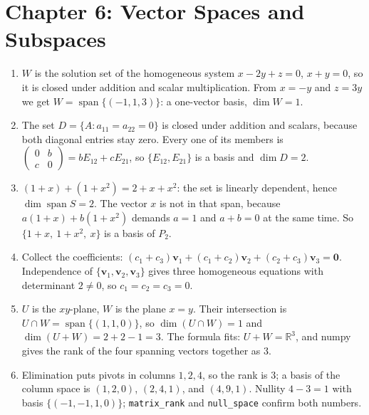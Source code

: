 
\section*{Chapter 6: Vector Spaces and Subspaces}
\begin{enumerate}[label=\textbf{6.\arabic*}]
  \item $W$ is the solution set of the homogeneous system $x-2y+z=0$, $x+y=0$, so it is
        closed under addition and scalar multiplication. From $x=-y$ and $z=3y$ we get
        $W=\operatorname{span}\{(-1,1,3)\}$: a one-vector basis, $\dim W=1$.

  \item The set $D=\{A:a_{11}=a_{22}=0\}$ is closed under addition and scalars,
        because both diagonal entries stay zero. Every one of its members is
        $\begin{pmatrix}0&b\\c&0\end{pmatrix}=bE_{12}+cE_{21}$, so
        $\{E_{12},E_{21}\}$ is a basis and $\dim D=2$.

  \item $(1+x)+(1+x^{2})=2+x+x^{2}$: the set is linearly dependent, hence
        $\dim\operatorname{span}S=2$. The vector $x$ is not in that span, because
        $a(1+x)+b(1+x^{2})$ demands $a=1$ and $a+b=0$ at the same time. So
        $\{1+x,\ 1+x^{2},\ x\}$ is a basis of $P_{2}$.

  \item Collect the coefficients: $(c_{1}+c_{3})\mathbf{v}_{1}+(c_{1}+c_{2})
        \mathbf{v}_{2}+(c_{2}+c_{3})\mathbf{v}_{3}=\mathbf{0}$. Independence of
        $\{\mathbf{v}_{1},\mathbf{v}_{2},\mathbf{v}_{3}\}$ gives three homogeneous
        equations with determinant $2\ne0$, so $c_{1}=c_{2}=c_{3}=0$.

  \item $U$ is the $xy$-plane, $W$ is the plane $x=y$. Their intersection is
        $U\cap W=\operatorname{span}\{(1,1,0)\}$, so $\dim(U\cap W)=1$ and
        $\dim(U+W)=2+2-1=3$. The formula fits: $U+W=\mathbb{R}^{3}$, and numpy
        gives the rank of the four spanning vectors together as $3$.

  \item Elimination puts pivots in columns $1,2,4$, so the rank is $3$; a basis of the
        column space is $(1,2,0)$, $(2,4,1)$, and $(4,9,1)$. Nullity $4-3=1$ with
        basis $\{(-1,-1,1,0)\}$; \texttt{matrix\_rank} and
        \texttt{null\_space} confirm both numbers.


\end{enumerate}
